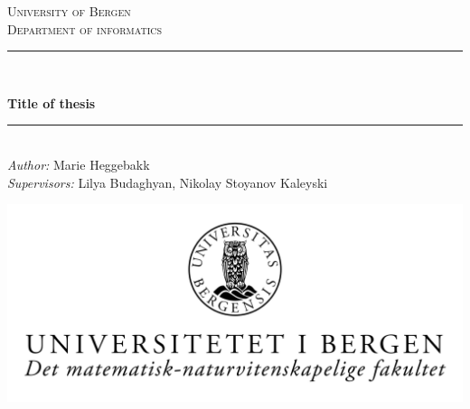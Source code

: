 \documentclass[12pt, a4paper, openright, twoside, final]{memoir}
\begin{document}
\begin{titlingpage}

\newcommand{\HRule}{\rule{\linewidth}{0.5mm}} %

\centering %


\textsc{\LARGE University of Bergen \\ Department of informatics}\\[1.5cm] %


\HRule \\[0.5cm]
\begin{Huge}
	\bfseries{Title of thesis}\\[0.7cm] %
\end{Huge}
\HRule \\[0.5cm]


\large \emph{Author:} Marie Heggebakk\\
\large \emph{Supervisors:} Lilya Budaghyan, Nikolay Stoyanov Kaleyski\\[2cm]


\centerline{\includegraphics[scale=1.8]{figure/UiB-logo}}


\end{titlingpage}
\end{document}
